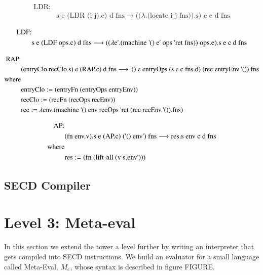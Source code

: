 \documentclass[fleqn]{article}
\theoremstyle{definition}
\newcommand{\ts}{\textquotesingle}
\newcommand{\mevl}{$M_{e}$}
\begin{document}
\begin{equation*}
	\begin{split}
		\text{LDR:} & \\
		& \text{s e (LDR (i j).c) d fns} \longrightarrow \text{(($\lambda$.(locate i j fns)).s) e c d fns}
	\end{split}
\end{equation*}

\begin{equation*}
	\begin{split}
		\text{LDF:} & \\
		& \text{s e (LDF ops.c) d fns} \longrightarrow \text{(($\lambda$e{\ts}.(machine {\ts}() e{\ts} ops {\ts}ret fns)) ops.e).s e c d fns}
	\end{split}
\end{equation*}

\begin{align*}
		\text{RAP:} & \\
		& \text{(entryClo recClo.s) e (RAP.c) d fns} \longrightarrow \text{{\ts}() e entryOps (s e c fns.d) (rec entryEnv {\ts}()).fns} \\
		\text{where}																																										\\
		& \text{entryClo} :=  \text{(entryFn (entryOps entryEnv))}																				\\
		& \text{recClo}	  :=  \text{(recFn (recOps recEnv))}																							\\
		& \text{rec}			:=  \text{$\lambda$env.(machine {\ts}() env recOps {\ts}ret (rec recEnv.{\ts}()).fns)}
\end{align*}

\begin{align*}
		\text{AP:} & \\
		& \text{(fn env.v).s e (AP.c) ({\ts}() env{\ts}) fns} \longrightarrow \text{res.s env c d fns}	\\
		\text{where}																																								\\
		& \text{res} 			:=  \text{(fn (lift-all (v s.env{\ts})))}
\end{align*}

\subsection{SECD Compiler}

\section{Level 3: Meta-eval}
In this section we extend the tower a level further by writing an interpreter that gets compiled into SECD instructions. We build an evaluator for a small language called Meta-Eval, \mevl, whose syntax is described in figure FIGURE.
\end{document}
